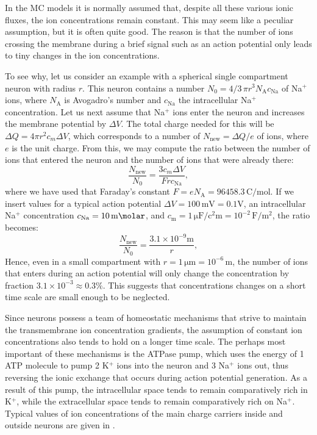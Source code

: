 In the MC models it is normally assumed that, despite all these various ionic fluxes, the ion concentrations remain constant. This may seem like a peculiar assumption, but it is often quite good. The reason is that the number of ions crossing the membrane during a brief signal such as an action potential only leads to tiny changes in the ion concentrations. 

To see why, let us consider an example with a spherical single compartment neuron with radius $r$. This neuron contains a number $N_0 = 4/3 \,\pi r^3 N_\text{A} c_\text{Na}$ of Na$^{+}$ ions, where $N_\text{A}$ is Avogadro's number and $c_\text{Na}$ the intracellular Na$^{+}$ concentration. Let us next assume that Na$^+$ ions enter the neuron and increases the membrane potential by $\Delta V$. The total charge needed for this will be $\Delta Q = 4 \pi r^2 c_m \Delta V$, which corresponds to a number of $N_\text{new} = \Delta Q/e$ of ions, where $e$ is the unit charge. From this, we may compute the ratio between the number of ions that entered the neuron and the number of ions that were already there:
\begin{equation}
\frac{N_\text{new}}{N_0} = \frac{3 c_m \Delta V}{F r c_\text{Na}}, 
\label{eq:Neuron:NaNaNa}
\end{equation}
where we have used that Faraday's constant $F = eN_\text{A} = 96458.3 \, \si{\coulomb\per\mol}$. If we insert values for a typical action potential $\Delta V = 100 \,\si{\milli\volt} = 0.1 \si{\volt}$, an intracellular Na$^+$ concentration $c_\text{Na} = 10 \, \si{\milli\molar}$, and $c_\text{m} = 1 \, \si{\micro\farad\per\square\centi\metre} = 10^{-2}\, \si{\farad\per\square\metre}$, the ratio becomes:
\begin{equation}
\frac{N_\text{new}}{N_0} = \frac{3.1 \times 10^{-9} \si{\metre}}{r}, 
\label{eq:Neuron:NaNaNaNa}
\end{equation}
Hence, even in a small compartment with $r=1\,\si{\micro\metre} = 10^{-6}\,\si{\metre}$, the number of ions that enters during an action potential will only change the concentration by fraction $3.1 \times 10^{-3} \approx 0.3 \%$. This suggests that concentrations changes on a short time scale are small enough to be neglected.

Since neurons possess a team of homeostatic mechanisms that strive to maintain the transmembrane 
ion concentration gradients, the assumption of constant ion concentrations also tends to hold on a longer time scale. The perhaps most important of these mechanisms is the ATPase pump, which uses the energy of 1 ATP molecule to pump 2 K$^+$ ions into the neuron and 3 Na$^+$ ions out, thus reversing the ionic exchange that occurs during action potential generation. As a result of this pump, the intracellular space tends to remain comparatively rich in K$^+$, while the extracellular space tends to remain comparatively rich on Na$^+$. Typical values of ion concentrations of the main charge carriers inside and outside neurons are given in . 

